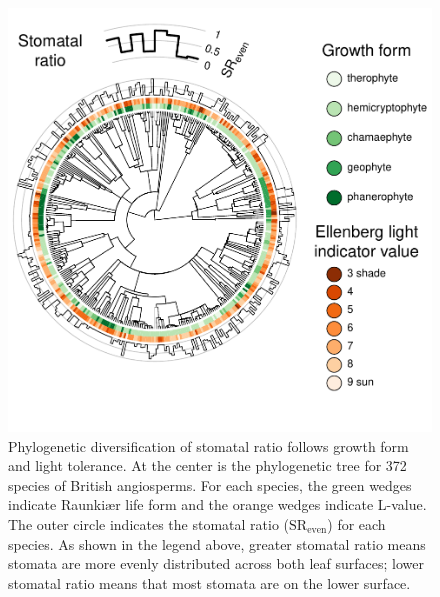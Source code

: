 \documentclass[12pt, oneside]{article}
\newcommand{\el}{L-value}
\begin{document}

\begin{figure}[ht]
\centerline{\includegraphics[width=\textwidth]{figures/figure_phylo-lifeform.pdf}}
\caption{Phylogenetic diversification of stomatal ratio follows growth form and light tolerance. At the center is the phylogenetic tree for 372 species of British angiosperms. For each species, the green wedges indicate Raunki\ae r life form and the orange wedges indicate \el. The outer circle indicates the stomatal ratio ($\mathrm{SR_{even}}$) for each species. As shown in the legend above, greater stomatal ratio means stomata are more evenly distributed across both leaf surfaces; lower stomatal ratio means that most stomata are on the lower surface.} 
\label{fig:phylo-lifeform}
\end{figure}
\end{document}
